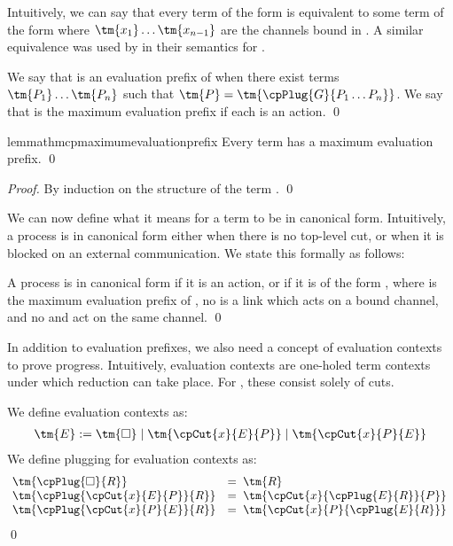 \documentclass[UKenglish]{llncs}
\begin{document}
Intuitively, we can say that every term of the form
 is equivalent to some term of the form
where $\tm{x_1} \dots \tm{x_{n-1}}$ are the channels bound in .
A similar equivalence was used by \textcite{lindley2015semantics} in their
semantics for \cp.
\begin{definition}\label{def:cp-maximum-evaluation-prefix}
  We say that  is an evaluation prefix of  when there exist terms
  $\tm{P_1} \dots \tm{P_n}$ such that $\tm{P} = \tm{\cpPlug{G}{P_1 \dots P_n}}$.
  We say that  is the maximum evaluation prefix if each  is an
  action. 
  \qed
\end{definition}
\begin{restatable}{lemma}{thmcpmaximumevaluationprefix}\label{thm:cp-maximum-evaluation-prefix}
  Every term  has a maximum evaluation prefix.
  \qed
\end{restatable}
\begin{proof}
  By induction on the structure of the term . 
  \qed
\end{proof}
We can now define what it means for a term to be in canonical form. Intuitively,
a process is in canonical form either when there is no top-level cut, or when it
is blocked on an external communication. We state this formally as follows:
\begin{definition}\label{def:cp-canonical-forms}
  A process  is in canonical form if it is an action, or if it is of the
  form , where  is the maximum evaluation
  prefix of , no  is a link which acts on a bound channel, and no
   and  act on the same channel.
  \qed
\end{definition}
In addition to evaluation prefixes, we also need a concept of evaluation
contexts to prove progress. Intuitively, evaluation contexts are one-holed term
contexts under which reduction can take place. For \cp, these consist solely of
cuts.
\begin{definition}\label{def:cp-evaluation-contexts}
  We define evaluation contexts as:
  \begin{align*}
    \tm{E} := \tm{\Box}
    \mid \tm{\cpCut{x}{E}{P}}
    \mid \tm{\cpCut{x}{P}{E}}
  \end{align*}
  We define plugging for evaluation contexts as:
  \begin{align*}
    \!\begin{array}{ll}
      \tm{\cpPlug{\Box}{R}}            
      & = \; \tm{R}
      \\
      \tm{\cpPlug{\cpCut{x}{E}{P}}{R}}
      & = \; \tm{\cpCut{x}{\cpPlug{E}{R}}{P}}
      \\
      \tm{\cpPlug{\cpCut{x}{P}{E}}{R}}
      & = \; \tm{\cpCut{x}{P}{\cpPlug{E}{R}}}
    \end{array}
  \end{align*}
  \qed
\end{definition}
\end{document}

